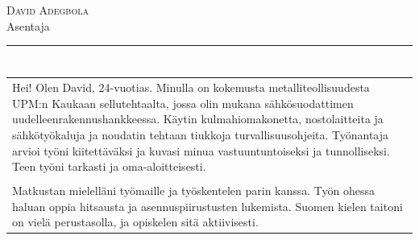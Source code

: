 \documentclass[a4paper,11pt]{article}
\begin{document}
\begin{cvheader}
\par{\centering
		{\Huge \textsc{David Adegbola}}\\[0.4em]
		{\Large Asentaja}
	\bigskip\par}

\hrule
\vspace{0.5em}
\end{cvheader}

\section{}
\begin{tabular}{p{}}
 Hei! Olen David, 24-vuotias. Minulla on kokemusta metalliteollisuudesta UPM:n Kaukaan sellutehtaalta, jossa olin mukana sähkösuodattimen uudelleenrakennushankkeessa. Käytin kulmahiomakonetta, nostolaitteita ja sähkötyökaluja ja noudatin tehtaan tiukkoja turvallisuusohjeita. Työnantaja arvioi työni kiitettäväksi ja kuvasi minua vastuuntuntoiseksi ja tunnolliseksi. Teen työni tarkasti ja oma-aloitteisesti.\\\\

 Matkustan mielelläni työmaille ja työskentelen parin kanssa. Työn ohessa haluan oppia hitsausta ja asennuspiirustusten lukemista. Suomen kielen taitoni on vielä perustasolla, ja opiskelen sitä aktiivisesti.
\end{tabular}

\section{}
\end{document}
